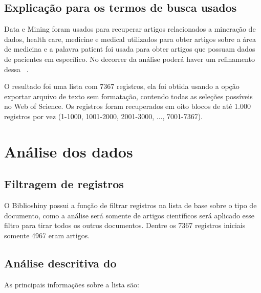 \subsection{Explicação para os termos de busca usados}
Data e Mining foram usados para recuperar artigos relacionados a mineração de dados, health care, medicine e medical utilizados para obter artigos sobre a área de medicina e a palavra patient foi usada para obter artigos que possuam dados de pacientes em específico. No decorrer da análise poderá haver um refinamento dessa \query\ .

O resultado foi uma lista com 7367 registros, ela foi obtida usando a opção exportar arquivo de texto sem formatação, contendo todas as seleções possíveis no Web of Science. Os registros foram recuperados em oito blocos de até 1.000 registros por vez (1-1000, 1001-2000, 2001-3000, ..., 7001-7367).

\section{Análise dos dados}

\subsection{Filtragem de registros}

O Biblioshiny possui a função de filtrar registros na lista de base sobre o tipo de documento, como a análise será somente de artigos científicos será aplicado esse filtro para tirar todos os outros documentos. Dentre os 7367 registros iniciais somente 4967 eram artigos.

\subsection{Análise descritiva do \dataset\ }

As principais informações sobre a lista são:

